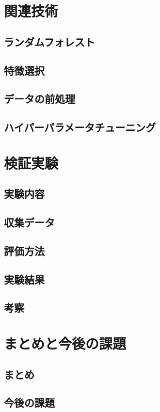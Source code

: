 \documentclass[platex]{suribt}
\begin{document}
\chapter{関連技術}
\section{ランダムフォレスト}
\section{特徴選択}
\section{データの前処理}
\section{ハイパーパラメータチューニング}

\chapter{検証実験}
\section{実験内容}
\section{収集データ}
\section{評価方法}
\section{実験結果}
\section{考察}

\chapter{まとめと今後の課題}
\section{まとめ}
\section{今後の課題}
\end{document}
